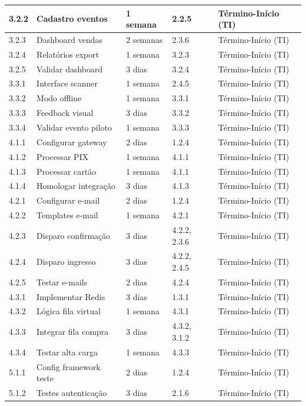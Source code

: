 \begin{table}[H]
\begin{tabular}{|p{1cm}|p{5cm}|p{2cm}|p{1.5cm}|p{3cm}|}
3.2.2 & Cadastro eventos & 1 semana & 2.2.5 & Término-Início (TI) \\ \hline
3.2.3 & Dashboard vendas & 2 semanas & 2.3.6 & Término-Início (TI) \\ \hline
3.2.4 & Relatórios export & 1 semana & 3.2.3 & Término-Início (TI) \\ \hline
3.2.5 & Validar dashboard & 3 dias & 3.2.4 & Término-Início (TI) \\ \hline
3.3.1 & Interface scanner & 1 semana & 2.4.5 & Término-Início (TI) \\ \hline
3.3.2 & Modo offline & 1 semana & 3.3.1 & Término-Início (TI) \\ \hline
3.3.3 & Feedback visual & 3 dias & 3.3.2 & Término-Início (TI) \\ \hline
3.3.4 & Validar evento piloto & 1 semana & 3.3.3 & Término-Início (TI) \\ \hline
4.1.1 & Configurar gateway & 2 dias & 1.2.4 & Término-Início (TI) \\ \hline
4.1.2 & Processar PIX & 1 semana & 4.1.1 & Término-Início (TI) \\ \hline
4.1.3 & Processar cartão & 1 semana & 4.1.1 & Término-Início (TI) \\ \hline
4.1.4 & Homologar integração & 3 dias & 4.1.3 & Término-Início (TI) \\ \hline
4.2.1 & Configurar e-mail & 2 dias & 1.2.4 & Término-Início (TI) \\ \hline
4.2.2 & Templates e-mail & 1 semana & 4.2.1 & Término-Início (TI) \\ \hline
4.2.3 & Disparo confirmação & 3 dias & 4.2.2, 2.3.6 & Término-Início (TI) \\ \hline
4.2.4 & Disparo ingresso & 3 dias & 4.2.2, 2.4.5 & Término-Início (TI) \\ \hline
4.2.5 & Testar e-mails & 2 dias & 4.2.4 & Término-Início (TI) \\ \hline
4.3.1 & Implementar Redis & 3 dias & 1.3.1 & Término-Início (TI) \\ \hline
4.3.2 & Lógica fila virtual & 1 semana & 4.3.1 & Término-Início (TI) \\ \hline
4.3.3 & Integrar fila compra & 3 dias & 4.3.2, 3.1.2 & Término-Início (TI) \\ \hline
4.3.4 & Testar alta carga & 1 semana & 4.3.3 & Término-Início (TI) \\ \hline
5.1.1 & Config framework teste & 2 dias & 1.2.4 & Término-Início (TI) \\ \hline
5.1.2 & Testes autenticação & 3 dias & 2.1.6 & Término-Início (TI) \\ \hline

\end{tabular}
\end{table}

